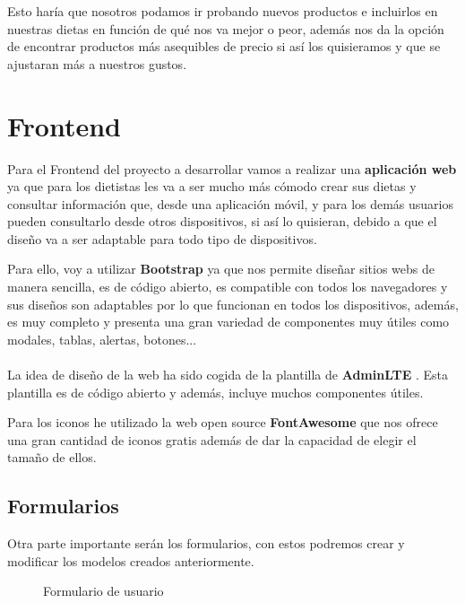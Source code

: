 Esto haría que nosotros podamos ir probando nuevos productos e incluirlos en nuestras dietas en función de qué nos va mejor o peor, además nos da la opción de encontrar productos más asequibles de precio si así los quisieramos y que se ajustaran más a nuestros gustos.

\section{Frontend} \label{sec:frontend}

Para el Frontend del proyecto a desarrollar vamos a realizar una \textbf{aplicación web} ya que para los dietistas les va a ser mucho más cómodo
crear sus dietas y consultar información que, desde una aplicación móvil, y para los demás usuarios pueden consultarlo desde otros dispositivos, si así lo quisieran, 
debido a que el diseño va a ser adaptable para todo tipo de dispositivos.

Para ello, voy a utilizar \textbf{Bootstrap} \cite{bootstrap} ya que nos permite diseñar sitios webs de manera sencilla,
es de código abierto, es compatible con todos los navegadores y sus diseños son adaptables por lo que funcionan en todos los dispositivos,
además, es muy completo y presenta una gran variedad de componentes muy útiles como modales, tablas, alertas, botones...\\ \\

La idea de diseño de la web ha sido cogida de la plantilla de \textbf{AdminLTE} \cite{adminlte}. Esta plantilla es de código abierto y 
además, incluye muchos componentes útiles.

Para los iconos he utilizado la web open source \textbf{FontAwesome} \cite{iconos} que nos 
ofrece una gran cantidad de iconos gratis además de dar la capacidad de elegir el tamaño de ellos.

\subsection{Formularios}

Otra parte importante serán los formularios, con estos podremos crear y modificar los modelos creados anteriormente.

\begin{figure}[H]
  \centering
  \noindent{}
  \caption{Formulario de usuario}
\end{figure}

